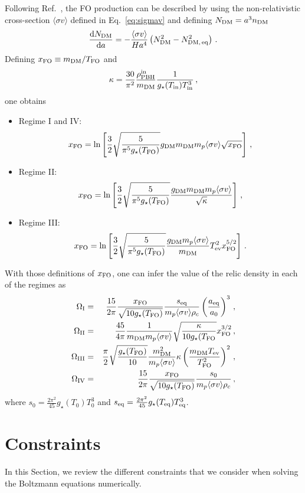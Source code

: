 \documentclass[aps,prd,reprint,twocolumn,preprintnumbers,floatfix,nofootinbib]{revtex4-1}
\newcommand{\be}{\begin{equation}}
\newcommand{\ee}{\end{equation}}
\newcommand{\bea}{\begin{eqnarray}}
\newcommand{\eea}{\end{eqnarray}}
\newcommand{\dd}{\text{d}}
\begin{document}
Following Ref.~\cite{Arias:2019uol}, the FO production can be described by using the non-relativistic cross-section $\langle\sigma v\rangle$ defined in Eq.~\eqref{eq:sigmav} and defining $N_{\rm DM}=a^3 n_{\rm DM}$
\be
\frac{\dd N_{\rm DM}}{\dd a} = -\frac{\langle\sigma v\rangle}{H a^4}\left(N_{\rm DM}^2-N_{\rm DM,\, eq}^2\right)\,.
\ee
Defining $x_{\rm FO}\equiv m_{\rm DM}/T_{\rm FO}$ and 
\be
\kappa = \frac{30}{\pi^2}\frac{\rho_{\rm PBH}^{\rm in}}{m_{\rm DM}}\frac{1}{g_\star(T_{\rm in})T_{\rm in}^3}\,,
\ee
one obtains
\begin{itemize}
  \item Regime I and IV: \be
x_{\rm FO}=\ln\left[\frac{3}{2}\sqrt{\frac{5}{\pi^5 g_\star(T_{\rm FO})}}g_{\rm DM}m_{\rm DM}m_p\langle\sigma v\rangle\sqrt{x_{\rm FO}}\right]\,,
\ee
\item Regime II:
\be
x_{\rm FO}=\ln\left[\frac{3}{2}\sqrt{\frac{5}{\pi^5 g_\star(T_{\rm FO})}}\frac{g_{\rm DM}m_{\rm DM}m_p\langle\sigma v\rangle}{\sqrt{\kappa}}\right]\,,
\ee
\item Regime III:
\be
x_{\rm FO}=\ln\left[\frac{3}{2}\sqrt{\frac{5}{\pi^5 g_\star(T_{\rm FO})}}\frac{g_{\rm DM}m_p\langle\sigma v\rangle}{m_{\rm DM}}T_{\rm ev}^2 x_{\rm FO}^{5/2}\right]\,.
\ee
\end{itemize}
With those definitions of $x_{\rm FO}$, one can infer the value of the relic density in each of the regimes as
\bea
\Omega_{\rm I} &=&\frac{15}{2\pi}\frac{x_{\rm FO}}{\sqrt{10 g_\star(T_{\rm FO})}}\frac{s_{\rm eq}}{m_p\langle\sigma v\rangle\rho_c}\left(\frac{a_{\rm eq}}{a_0}\right)^3\,,\nonumber\\
\Omega_{\rm II}&=&\frac{45}{4\pi}\frac{1}{m_{\rm DM}m_p\langle\sigma v\rangle}\sqrt{\frac{\kappa}{10g_\star(T_{\rm FO}}}x_{\rm FO}^{3/2}\,,\nonumber\\
\Omega_{\rm III}&=&\frac{\pi}{2}\sqrt{\frac{g_\star(T_{\rm FO})}{10}}\frac{m_{\rm DM}^2}{m_p\langle\sigma v\rangle}\kappa\left(\frac{m_{\rm DM}T_{\rm ev}}{T_{\rm FO}^2}\right)^2\,,\nonumber\\
\Omega_{\rm IV} &=&\frac{15}{2\pi}\frac{x_{\rm FO}}{\sqrt{10 g_\star(T_{\rm FO})}}\frac{s_0}{m_p\langle\sigma v\rangle\rho_c}\,,\nonumber\\
\eea
where $s_0=\frac{2\pi^2}{45}g_\star(T_0)T_0^3$ and $s_{\rm eq}=\frac{2\pi^2}{45}g_\star(T_{\rm eq})T_{\rm eq}^3$.

\section{Constraints}\label{sec:constraints}
In this Section, we review the different constraints that we consider when solving the Boltzmann equations numerically.
\end{document}
